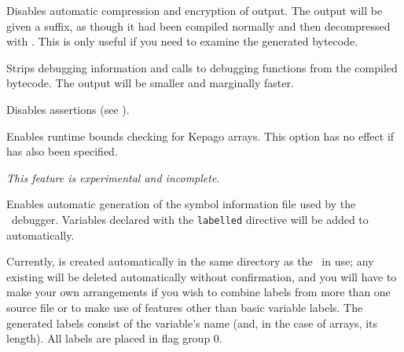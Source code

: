   \begin{nicelist}
  \item[\clboth{u}{uncompressed}]
    Disables automatic compression and encryption of output.  The output will be
    given a  suffix, as though it had been compiled normally
    and then decompressed with .  This is only useful if you need
    to examine the generated bytecode.
  \item[\clboth{g}{no-debug}]
    Strips debugging information and calls to debugging functions from the 
    compiled bytecode.  The output will be smaller and marginally faster.
  \item[\cllong{no-assert}]
    Disables assertions (see ).
  \item[\cllong{safe-arrays}]
    Enables runtime bounds checking for Kepago arrays.  This option has no effect 
    if  has also been specified.
  \item[\cllong{flag-labels}]
    \emph{This feature is experimental and incomplete.}

    Enables automatic generation of the  symbol information file 
    used by the \reallive\ debugger.  Variables declared with the 
    \texttt{labelled} directive will be added to  automatically.  
    
    Currently,  is created automatically in the same directory as 
    the \gameexe\ in use; any existing  will be deleted 
    automatically without confirmation, and you will have to make your own 
    arrangements if you wish to combine labels from more than one source file or 
    to make use of  features other than basic variable labels. 
    The generated labels consist of the variable's name (and, in the case of 
    arrays, its length).  All labels are placed in flag group 0.    
  \end{nicelist}

